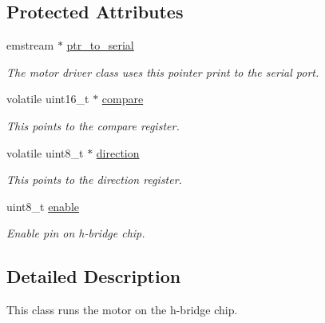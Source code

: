 \subsection*{\-Protected \-Attributes}
\begin{DoxyCompactItemize}
\item 
\hypertarget{classmotor__driver_a5d94686caee87309fc36257bcab1035f}{emstream $\ast$ \hyperlink{classmotor__driver_a5d94686caee87309fc36257bcab1035f}{ptr\-\_\-to\-\_\-serial}}\label{classmotor__driver_a5d94686caee87309fc36257bcab1035f}

\begin{DoxyCompactList}\small\item\em \-The motor driver class uses this pointer print to the serial port. \end{DoxyCompactList}\item 
\hypertarget{classmotor__driver_a3c15d9a1839e286d7f5081b471c6f967}{volatile uint16\-\_\-t $\ast$ \hyperlink{classmotor__driver_a3c15d9a1839e286d7f5081b471c6f967}{compare}}\label{classmotor__driver_a3c15d9a1839e286d7f5081b471c6f967}

\begin{DoxyCompactList}\small\item\em \-This points to the compare register. \end{DoxyCompactList}\item 
\hypertarget{classmotor__driver_a0a51fcc2cd6c747fa6e892c3b00cf575}{volatile uint8\-\_\-t $\ast$ \hyperlink{classmotor__driver_a0a51fcc2cd6c747fa6e892c3b00cf575}{direction}}\label{classmotor__driver_a0a51fcc2cd6c747fa6e892c3b00cf575}

\begin{DoxyCompactList}\small\item\em \-This points to the direction register. \end{DoxyCompactList}\item 
\hypertarget{classmotor__driver_a3679745ec176df2d78ce091cd2a55589}{uint8\-\_\-t \hyperlink{classmotor__driver_a3679745ec176df2d78ce091cd2a55589}{enable}}\label{classmotor__driver_a3679745ec176df2d78ce091cd2a55589}

\begin{DoxyCompactList}\small\item\em \-Enable pin on h-\/bridge chip. \end{DoxyCompactList}\end{DoxyCompactItemize}


\subsection{\-Detailed \-Description}
\-This class runs the motor on the h-\/bridge chip. 

